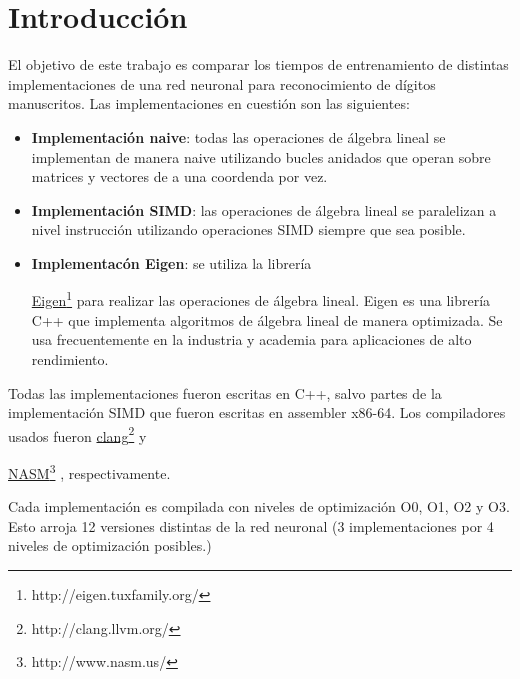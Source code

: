 \documentclass[a4paper, 10pt, twoside]{article}
\newcommand{\link}[2]{
  \href{#1}{#2}\footnote{#1}
}
\begin{document}
\newpage




\tableofcontents

\newpage




\section{Introducción}

El objetivo de este trabajo es comparar los tiempos de entrenamiento de
distintas implementaciones de una red neuronal para reconocimiento de dígitos
manuscritos. Las implementaciones en cuestión son las siguientes:

\begin{itemize}
  \item \textbf{Implementación naive}: todas las operaciones de álgebra lineal
    se implementan de manera naive utilizando bucles anidados que operan sobre
    matrices y vectores de a una coordenda por vez.

  \item \textbf{Implementación SIMD}: las operaciones de álgebra lineal se
    paralelizan a nivel instrucción utilizando operaciones SIMD siempre que sea
    posible.

  \item \textbf{Implementacón Eigen}: se utiliza la librería
    \link{http://eigen.tuxfamily.org/}{Eigen} para realizar las operaciones de
    álgebra lineal. Eigen es una librería C++ que implementa algoritmos de
    álgebra lineal de manera optimizada. Se usa frecuentemente en la industria
    y academia para aplicaciones de alto rendimiento.
\end{itemize}

Todas las implementaciones fueron escritas en C++, salvo partes de la
implementación SIMD que fueron escritas en assembler x86-64. Los compiladores
usados fueron \link{http://clang.llvm.org/}{clang} y
\link{http://www.nasm.us/}{NASM}, respectivamente.

Cada implementación es compilada con niveles de optimización O0, O1, O2 y O3.
Esto arroja 12 versiones distintas de la red neuronal (3 implementaciones por 4
niveles de optimización posibles.)
\end{document}
